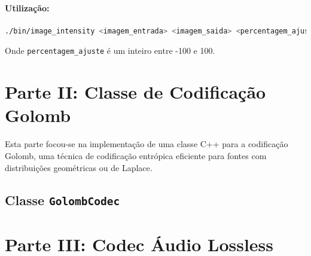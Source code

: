 \documentclass[a4paper, 11pt, portuguese]{article}
\begin{document}
\paragraph{Utilização:}
\begin{lstlisting}[language=bash, caption=Sintaxe de Uso do image\_intensity]
./bin/image_intensity <imagem_entrada> <imagem_saida> <percentagem_ajuste>
\end{lstlisting}
Onde \texttt{percentagem\_ajuste} é um inteiro entre -100 e 100.



\section{Parte II: Classe de Codificação Golomb}

Esta parte focou-se na implementação de uma classe C++ para a codificação Golomb, uma técnica de codificação entrópica eficiente para fontes com distribuições geométricas ou de Laplace.

\subsection{Classe \texttt{GolombCodec}} %



\section{Parte III: Codec Áudio Lossless}
\end{document}
